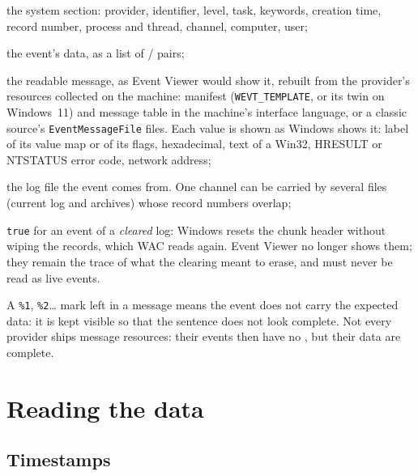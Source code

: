\documentclass[11pt,a4paper,oneside]{report}
\begin{document}
\begin{description}[style=nextline,leftmargin=1.2em]
  \item[\champ{EvtSystem*}] the system section: provider, identifier, level,
        task, keywords, creation time, record number, process and thread,
        channel, computer, user;
  \item[\champ{EvtEventData}] the event's data, as a list of  /
         pairs;
  \item[\champ{EvtEventMessage}] the readable message, as Event Viewer would show
        it, rebuilt from the provider's resources collected on the machine:
        manifest (\texttt{WEVT\_TEMPLATE}, or its twin
         on Windows~11) and message
        table in the machine's interface language, or a classic source's
        \texttt{EventMessageFile} files. Each value is shown as Windows shows
        it: label of its value map or of its flags, hexadecimal, text of a
        Win32, HRESULT or NTSTATUS error code, network address;
  \item[\champ{EvtSourceLog}] the log file the event comes from. One channel can
        be carried by several files (current log and archives) whose record
        numbers overlap;
  \item[\champ{EvtRecovered}] \texttt{true} for an event of a \emph{cleared}
        log: Windows resets the chunk header without wiping the records, which
        WAC reads again. Event Viewer no longer shows them; they remain the
        trace of what the clearing meant to erase, and must never be read as
        live events.
\end{description}

\begin{note}
A \texttt{\%1}, \texttt{\%2}\ldots{} mark left in a message means the event does
not carry the expected data: it is kept visible so that the sentence does not
look complete. Not every provider ships message resources: their events then
have no , but their data are complete.
\end{note}

\chapter{Reading the data}\label{chap:lecture}

\section{Timestamps}
\end{document}
